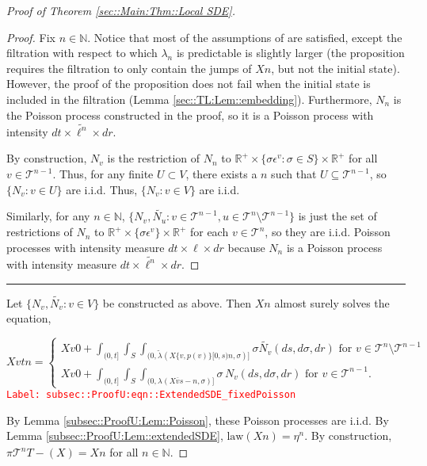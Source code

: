 \documentclass[12pt]{article}
\newcommand{\mb}{\mathbb}
\newcommand{\mc}{\mathcal}
\newcommand{\ov}{\overline}
\newcommand{\te}{\text}
\newcommand{\ep}{\epsilon}
\newcommand{\tr}{\textcolor{red}}
\newcommand{\labe}[1]{\tr{\texttt{Label: #1}}}
\newcommand{\ind}{\hspace{24pt}}
\newcommand{\lin}{\rule{\linewidth}{0.4 pt}}
\renewcommand{\v}{v}							%
\newcommand{\vv}{u}								%
\renewcommand{\U}{U}							%
\renewcommand{\S}{S}							%
\newcommand{\s}{\sigma}							%
\newcommand{\ev}[1]{\ep^{#1}}					%
\newcommand{\T}{T}								%
\renewcommand{\t}{t}							%
\newcommand{\proj}{\pi}							%
\renewcommand{\tt}{s}							%
\newcommand{\X}{X}								%
\newcommand{\cl}{\ov}							%
\newcommand{\tree}{\mc{T}}						%
\newcommand{\sln}[1]{^{#1}}						%
\newcommand{\poiss}[1]{N_{#1}}						%
\renewcommand{\r}{r}								%
\newcommand{\mmm}[3]{\eta_{#2#1}^{#3}}						%
\newcommand{\rate}[1]{\lambda_{#1}}					%
\newcommand{\crate}[2]{\alt{\lambda}_{#1}^{#2}}		%
\newcommand{\Sm}{\ell}								%
\newcommand{\alt}{\widetilde}						%
\newcommand{\p}[1]{p(#1)}						%
\begin{document}
\begin{proof}[Proof of Theorem \ref{sec::Main:Thm::Local SDE}]
\begin{proof}
Fix \(n \in \mb{N}\). Notice that most of the assumptions of \cite[Proposition 14.7.I(b)]{DalVer08} are satisfied, except the filtration with respect to which \(\rate{n}\) is predictable is slightly larger (the proposition requires the filtration to only contain the jumps of \(\X{}{}{n}\), but not the initial state). However, the proof of the proposition does not fail when the initial state is included in the filtration (Lemma \ref{sec::TL:Lem::embedding}). Furthermore, \(\poiss{n}\) is the Poisson process constructed in the proof, so it is a Poisson process with intensity \(d\t\times \alt{\Sm^n}\times d\r\).

\ind By construction, \(\poiss{\v}\) is the restriction of \(\poiss{n}\) to \(\mb{R}^+ \times \{\s\ev{\v}: \s\in \S\}\times \mb{R}^+\) for all \(\v\in \tree\sln{n-1}\). Thus, for any finite \(\U \subset  V\), there exists a \(n\) such that \(\U \subseteq \tree\sln{n-1}\), so \(\{\poiss{\v}: \v\in \U\}\) are i.i.d. Thus, \(\{\poiss{\v}: \v\in  V\}\) are i.i.d.

\ind Similarly, for any \(n \in \mb{N}\), \(\{\poiss{\v},\alt{\poiss{\vv}}: \v \in \tree\sln{n-1},\vv\in\tree\sln{n}\setminus\tree\sln{n-1}\}\) is just the set of restrictions of \(\poiss{n}\) to \(\mb{R}^+\times\{\s\ev{\v}\}\times\mb{R}^+\) for each \(\v\in \tree\sln{n}\), so they are i.i.d. Poisson processes with intensity measure \(d\t\times \Sm\times d\r\) because \(\poiss{n}\) is a Poisson process with intensity measure \(d\t\times\alt{\Sm^n}\times d\r\).
\end{proof}

\lin

Let \(\{\poiss{\v},\alt{\poiss{\v}}:\v\in V\}\) be constructed as above. Then \(\X{}{}{n}\) almost surely solves the equation,

\begin{equation}
\X{\v}{\t}{n} = \begin{cases}
\X{\v}{0}{} + \int_{(0,\t]}\int_\S\int_{(0,\crate{}{}(\X{\{\v,\p{\v}\}}{[0,\tt)}{n},\s)]}\s\alt{\poiss{\v}}(d\tt,d\s,d\r)\te{ for } \v \in \tree\sln{n}\setminus\tree\sln{n-1}\\
\X{\v}{0}{} + \int_{(0,\t]}\int_\S\int_{(0,\rate{}(\X{\cl{\v}}{\tt-}{n},\s)]}\s\,\poiss{\v}(d\tt,d\s,d\r)\te{ for } \v \in \tree\sln{n-1}.
\end{cases}
\label{subsec::ProofU:eqn::ExtendedSDE_fixedPoisson}
\end{equation}
\labe{subsec::ProofU:eqn::ExtendedSDE\_fixedPoisson}

By Lemma \ref{subsec::ProofU:Lem::Poisson}, these Poisson processes are i.i.d. By Lemma \ref{subsec::ProofU:Lem::extendedSDE}, \(\te{law}(\X{}{}{n}) = \mmm{}{}{n}\). By construction, \(\proj{\tree\sln{n}}{\T-}(\X{}{}) = \X{}{}{n}\) for all \(n\in\mb{N}\).


\end{proof}
\end{document}
